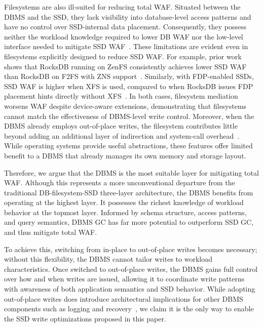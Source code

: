 Filesystems are also ill-suited for reducing total WAF.
Situated between the DBMS and the SSD, they lack visibility into database-level access patterns and have no control over SSD-internal data placement.
Consequently, they possess neither the workload knowledge required to lower DB WAF nor the low-level interface needed to mitigate SSD WAF~\cite{DBLP:conf/usenix/BjorlingAHRMGA21}.
These limitations are evident even in filesystems explicitly designed to reduce SSD WAF.
For example, prior work shows that RocksDB running on ZenFS consistently achieves lower SSD WAF than RocksDB on F2FS with ZNS support~\cite{DBLP:conf/usenix/BjorlingAHRMGA21}.
Similarly, with FDP-enabled SSDs, SSD WAF is higher when XFS is used, compared to when RocksDB issues FDP placement hints directly without XFS~\cite{fdprocksdb}.
In both cases, filesystem mediation worsens WAF despite device-aware extensions, demonstrating that filesystems cannot match the effectiveness of DBMS-level write control.
Moreover, when the DBMS already employs out-of-place writes, the filesystem contributes little beyond adding an additional layer of indirection and system-call overhead~\cite{DBLP:conf/icde/NguyenL24,DBLP:conf/icit/HinesCA23,DBLP:journals/corr/SearsIG07,DBLP:journals/pvldb/GaffneyPBHKP22}.
While operating systems provide useful abstractions, these features offer limited benefit to a DBMS that already manages its own memory and storage layout.

Therefore, we argue that the DBMS is the most suitable layer for mitigating total WAF.
Although this represents a more unconventional departure from the traditional DB-filesystem-SSD three-layer architecture,
the DBMS benefits from operating at the highest layer.
It possesses the richest knowledge of workload behavior at the topmost layer.
Informed by schema structure, access patterns, and query semantics, DBMS GC has far more potential to outperform SSD GC, and thus mitigate total WAF.

To achieve this, switching from in-place to out-of-place writes becomes necessary; without this flexibility, the DBMS cannot tailor writes to workload characteristics.
Once switched to out-of-place writes, the DBMS gains full control over how and when writes are issued,
allowing it to coordinate write patterns with awareness of both application semantics and SSD behavior.
While adopting out-of-place writes does introduce architectural implications for other DBMS components such as logging and recovery~\cite{WObtree},
we claim it is the only way to enable the SSD write optimizations proposed in this paper.
